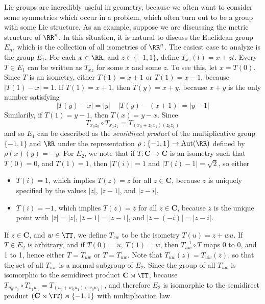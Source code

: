 Lie groups are incredibly useful in geometry, because we often want to consider some symmetries which occur in a problem, which often turn out to be a group with some Lie structure. As an example, suppose we are discussing the metric structure of $\RR^n$. In this situation, it is natural to discuss the Euclidean group $E_n$, which is the collection of all isometries of $\RR^n$. The easiest case to analyze is the group $E_1$. For each $x \in \RR$, and $z \in \{ -1, 1 \}$, define $T_{xz}(t) = x + zt$. Every $T \in E_1$ can be written as $T_{xz}$ for some $x$ and some $z$. To see this, let $x = T(0)$. Since $T$ is an isometry, either $T(1) = x + 1$ or $T(1) = x - 1$, because $|T(1) - x| = 1$. If $T(1) = x + 1$, then $T(y) = x + y$, because $x + y$ is the only number satisfying
%
\[ |T(y) - x| = |y|\ \ \ \ \ |T(y) - (x + 1)| = |y - 1|  \]
%
Similarily, if $T(1) = y - 1$, then $T(x) = y - x$. Since
%
\[ T_{x_0z_0} \circ T_{x_1z_1} = T_{(x_0 + z_0x_1)(z_0z_1)} \]
%
and so $E_1$ can be described as the {\it semidirect product} of the multiplicative group $\{ -1, 1 \}$ and $\RR$ under the representation $\rho: \{ -1, 1 \} \to \text{Aut}(\RR)$ defined by $\rho(x)(y) = -y$. For $E_2$, we note that if $T: \mathbf{C} \to \mathbf{C}$ is an isometry such that $T(0) = 0$, and $T(1) = 1$, then $|T(i)| = 1$ and $|T(i) - 1| = \sqrt{2}$, so either
%
\begin{itemize}
    \item $T(i) = 1$, which implies $T(z) = z$ for all $z \in \mathbf{C}$, because $z$ is uniquely specified by the values $|z|$, $|z - 1|$, and $|z - i|$.
    \item $T(i) = -1$, which implies $T(z) = \overline{z}$ for all $z \in \mathbf{C}$, because $\overline{z}$ is the unique point with $|\overline{z}| = |z|$, $|\overline{z} - 1| = |z - 1|$, and $|\overline{z} - (-i)| = |z - i|$.
\end{itemize}
%
If $z \in \mathbf{C}$, and $w \in \TT$, we define $T_{zw}$ to be the isometry $T(u) = z + wu$. If $T \in E_2$ is arbitrary, and if $T(0) = u$, $T(1) = w$, then $T_{uw}^{-1} \circ T$ maps 0 to 0, and 1 to 1, hence either $T = T_{uw}$ or $T = \overline{T_{uw}}$. Note that $\overline{T_{uw}}(z) = T_{\overline{uw}}(\overline{z})$, so that the set of all $T_{uw}$ is a normal subgroup of $E_2$. Since the group of all $T_{uw}$ is isomorphic to the semidirect product $\mathbf{C} \rtimes \TT$, because $T_{u_0w_0} \circ T_{u_1w_1} = T_{(u_0 + w_0u_1)(w_0w_1)}$, and therefore $E_2$ is isomorphic to the semidirect product $(\mathbf{C} \rtimes \TT) \rtimes \{ -1, 1 \}$ with multiplication law
